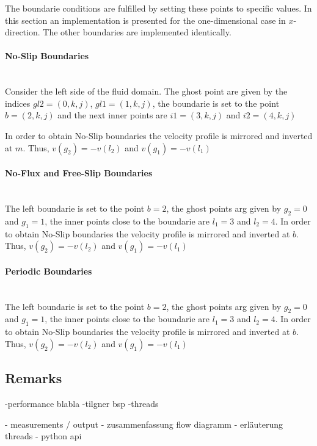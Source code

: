 The boundarie conditions are fulfilled by setting these points to specific values.
In this section an  implementation is presented for the one-dimensional case in $x$-direction.
The other boundaries are implemented identically.

\paragraph{No-Slip Boundaries}\mbox{}\\

Consider the left side of the fluid domain. The ghost point are given by the indices $gl2=(0, k, j)$,
$gl1=(1, k, j)$, the boundarie is set to the point $b=(2, k, j)$ and the next inner points are
$i1=(3, k, j)$ and $i2=(4, k, j)$

In order to obtain No-Slip boundaries the velocity profile is mirrored and inverted
at $m$. Thus, $v(g_2) = -v(l_2)$ and  $v(g_1) = -v(l_1)$


\paragraph{No-Flux and Free-Slip Boundaries}\mbox{}\\

The left boundarie is set to the point $b=2$,
the ghost points arg given by $g_2=0$ and $g_1=1$, the inner points close
to the boundarie are $l_1=3$ and $l_2=4$.
In order to obtain No-Slip boundaries the velocity profile is mirrored and inverted
at $b$. Thus, $v(g_2) = -v(l_2)$ and  $v(g_1) = -v(l_1)$


\paragraph{Periodic Boundaries}\mbox{}\\

The left boundarie is set to the point $b=2$,
the ghost points arg given by $g_2=0$ and $g_1=1$, the inner points close
to the boundarie are $l_1=3$ and $l_2=4$.
In order to obtain No-Slip boundaries the velocity profile is mirrored and inverted
at $b$. Thus, $v(g_2) = -v(l_2)$ and  $v(g_1) = -v(l_1)$

\subsection{Remarks}

-performance blabla
-tilgner bsp
-threads

- measurements / output
- zusammenfassung flow diagramm
- erläuterung threads
- python api

